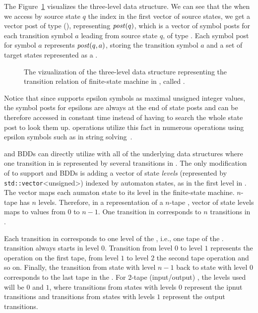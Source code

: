The Figure~\ref{fig:delta_struct} visualizes the three-level \deltastruct data structure. We can see that the when we access by source state $q$ the index in the first vector of source states, we get a vector post of type \statepost (\statepost[q]), representing $\mathit{post}(q)$, which is a vector of symbol posts for each transition symbol $a$ leading from source state $q$, of type \symbolpost.
Each symbol post for symbol $a$ represents $\mathit{post}(q, a)$, storing the transition symbol $a$ and a set of target states represented as a \ordvector.

\begin{figure}[ht]
\begin{center}

\end{center}
\caption{
The vizualization of the three-level data structure representing the transition relation of finite-state machine in \mata, called \deltastruct.
}
\label{fig:delta_struct}
\end{figure}

Notice that since \mata supports epsilon symbols as maximal unsigned integer values, the symbol posts for epsilons are always at the end of state posts and can be therefore accessed in constant time instead of having to search the whole state post to look them up. \mata operations utilize this fact in numerous operations using epsilon symbols such as in string solving~\cite{fm23_equations_synergy_regular_constraints_DBLP:conf/fm/BlahoudekCCHHLS23}.

\nfts and BDDs can directly utilize \nfaClass with all of the underlying data structures where one transition in \nft is represented by several transitions in \nfaClass.
The only modification of \nfaClass to support \nfts and BDDs is adding a vector of state \emph{levels} (represented by \texttt{std::vector}<unsigned>) indexed by automaton states, as in the first level in \deltastruct. The vector maps each aumaton state to its level in the finite-state machine.
$n$-tape \nft has $n$ levels.
Therefore, in a representation of a $n$-tape \nft, vector of state levels maps to values from $0$ to $n-1$.
One transition in \nft corresponds to $n$ transitions in \nfaClass.

Each transition in \nfaClass corresponds to one level of the \nft, i.e., one tape of the \nft.
\nft transition always starts in level $0$. Transition from level $0$ to level $1$ represents the operation on the first \nft tape, from level $1$ to level $2$ the second \nft tape operation and so on.
Finally, the transition from state with level $n-1$ back to state with level $0$ corresponds to the last tape in the \nft.
For 2-tape (input/output) \nft, the levels used will be $0$ and $1$, where transitions from states with levels $0$ represent the ipnut transitions and transitions from states with levels $1$ represent the output transitions.

